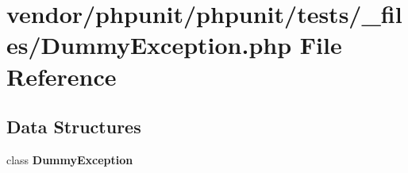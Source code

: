 \section{vendor/phpunit/phpunit/tests/\+\_\+files/\+Dummy\+Exception.php File Reference}
\label{phpunit_2phpunit_2tests_2__files_2_dummy_exception_8php}
\subsection*{Data Structures}
\begin{DoxyCompactItemize}
\item 
class {\bf Dummy\+Exception}
\end{DoxyCompactItemize}
